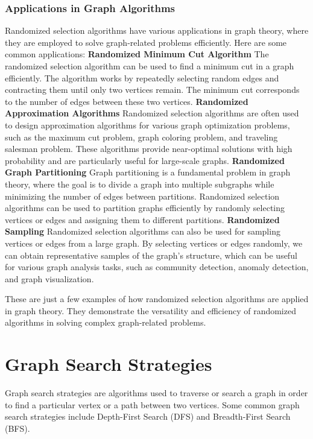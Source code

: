 \documentclass[12pt]{book} %
\begin{document}
\subsubsection{Applications in Graph Algorithms}
Randomized selection algorithms have various applications in graph theory, where they are employed to solve graph-related problems efficiently. Here are some common applications:
\FloatBarrier
\textbf{Randomized Minimum Cut Algorithm}
\FloatBarrier
The randomized selection algorithm can be used to find a minimum cut in a graph efficiently. The algorithm works by repeatedly selecting random edges and contracting them until only two vertices remain. The minimum cut corresponds to the number of edges between these two vertices.
\FloatBarrier
\textbf{Randomized Approximation Algorithms}
\FloatBarrier
Randomized selection algorithms are often used to design approximation algorithms for various graph optimization problems, such as the maximum cut problem, graph coloring problem, and traveling salesman problem. These algorithms provide near-optimal solutions with high probability and are particularly useful for large-scale graphs.
\FloatBarrier
\textbf{Randomized Graph Partitioning}
\FloatBarrier
Graph partitioning is a fundamental problem in graph theory, where the goal is to divide a graph into multiple subgraphs while minimizing the number of edges between partitions. Randomized selection algorithms can be used to partition graphs efficiently by randomly selecting vertices or edges and assigning them to different partitions.
\FloatBarrier
\textbf{Randomized Sampling}
\FloatBarrier
Randomized selection algorithms can also be used for sampling vertices or edges from a large graph. By selecting vertices or edges randomly, we can obtain representative samples of the graph's structure, which can be useful for various graph analysis tasks, such as community detection, anomaly detection, and graph visualization.

These are just a few examples of how randomized selection algorithms are applied in graph theory. They demonstrate the versatility and efficiency of randomized algorithms in solving complex graph-related problems.
\FloatBarrier

\section{Graph Search Strategies}
Graph search strategies are algorithms used to traverse or search a graph in order to find a particular vertex or a path between two vertices. Some common graph search strategies include Depth-First Search (DFS) and Breadth-First Search (BFS).
\end{document}
